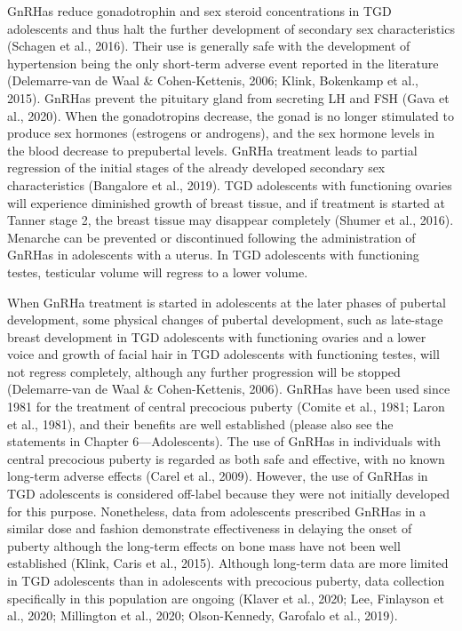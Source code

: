 \documentclass[
]{book}
\begin{document}
GnRHas reduce gonadotrophin and sex steroid
concentrations in TGD adolescents and thus halt
the further development of secondary sex characteristics (Schagen et al., 2016). Their use is
generally safe with the development of hypertension being the only short-term adverse event
reported in the literature (Delemarre-van de Waal
\& Cohen-Kettenis, 2006; Klink, Bokenkamp et al.,
2015). GnRHas prevent the pituitary gland from
secreting LH and FSH (Gava et al., 2020). When
the gonadotropins decrease, the gonad is no longer stimulated to produce sex hormones (estrogens or androgens), and the sex hormone levels
in the blood decrease to prepubertal levels.
GnRHa treatment leads to partial regression of
the initial stages of the already developed secondary sex characteristics (Bangalore et al., 2019).
TGD adolescents with functioning ovaries will
experience diminished growth of breast tissue,
and if treatment is started at Tanner stage 2, the
breast tissue may disappear completely (Shumer
et al., 2016). Menarche can be prevented or discontinued following the administration of GnRHas
in adolescents with a uterus. In TGD adolescents
with functioning testes, testicular volume will
regress to a lower volume.

When GnRHa treatment is started in adolescents at the later phases of pubertal development,
some physical changes of pubertal development,
such as late-stage breast development in TGD
adolescents with functioning ovaries and a lower
voice and growth of facial hair in TGD adolescents with functioning testes, will not regress
completely, although any further progression will
be stopped (Delemarre-van de Waal \&
Cohen-Kettenis, 2006). GnRHas have been used
since 1981 for the treatment of central precocious
puberty (Comite et al., 1981; Laron et al., 1981),
and their benefits are well established (please also
see the statements in Chapter 6---Adolescents).
The use of GnRHas in individuals with central
precocious puberty is regarded as both safe and
effective, with no known long-term adverse
effects (Carel et al., 2009). However, the use of
GnRHas in TGD adolescents is considered
off-label because they were not initially developed
for this purpose. Nonetheless, data from adolescents prescribed GnRHas in a similar dose and
fashion demonstrate effectiveness in delaying the
onset of puberty although the long-term effects
on bone mass have not been well established
(Klink, Caris et al., 2015). Although long-term
data are more limited in TGD adolescents than
in adolescents with precocious puberty, data collection specifically in this population are ongoing
(Klaver et al., 2020; Lee, Finlayson et al., 2020;
Millington et al., 2020; Olson-Kennedy, Garofalo
et al., 2019).
\end{document}
